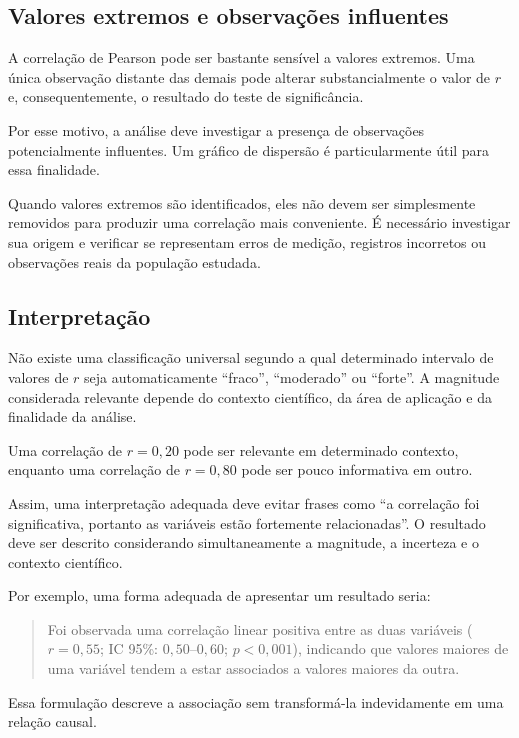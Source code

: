 \subsection{Valores extremos e observações influentes}

A correlação de Pearson pode ser bastante sensível a valores extremos.
Uma única observação distante das demais pode alterar substancialmente o valor
de $r$ e, consequentemente, o resultado do teste de significância.

Por esse motivo, a análise deve investigar a presença de observações
potencialmente influentes. Um gráfico de dispersão é particularmente útil
para essa finalidade.

Quando valores extremos são identificados, eles não devem ser simplesmente
removidos para produzir uma correlação mais conveniente. É necessário
investigar sua origem e verificar se representam erros de medição, registros
incorretos ou observações reais da população estudada.

\subsection{Interpretação}

Não existe uma classificação universal segundo a qual determinado intervalo
de valores de $r$ seja automaticamente ``fraco'', ``moderado'' ou ``forte''.
A magnitude considerada relevante depende do contexto científico, da área de
aplicação e da finalidade da análise.

Uma correlação de $r=0{,}20$ pode ser relevante em determinado contexto,
enquanto uma correlação de $r=0{,}80$ pode ser pouco informativa em outro.

Assim, uma interpretação adequada deve evitar frases como ``a correlação foi
significativa, portanto as variáveis estão fortemente relacionadas''. O
resultado deve ser descrito considerando simultaneamente a magnitude, a
incerteza e o contexto científico.

Por exemplo, uma forma adequada de apresentar um resultado seria:

\begin{quote}
Foi observada uma correlação linear positiva entre as duas variáveis
($r=0{,}55$; IC 95\%: $0{,}50$--$0{,}60$; $p<0{,}001$), indicando que valores
maiores de uma variável tendem a estar associados a valores maiores da outra.
\end{quote}

Essa formulação descreve a associação sem transformá-la indevidamente em uma
relação causal.

